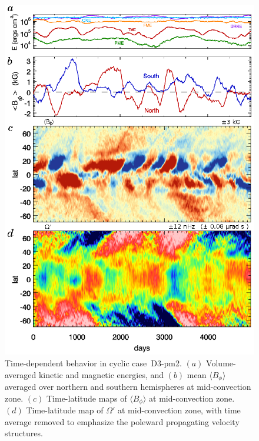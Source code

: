 \begin{figure}
  \begin{center}
    \includegraphics[width=0.8\linewidth]{figs/chapter_8/time_history_mmc_vturf_3_pm2.eps}
  \end{center}
    \caption[Time-dependent behavior in cyclic case~D3-pm2]
	  {Time-dependent behavior in cyclic case~D3-pm2.  $(a)$
	  Volume-averaged kinetic and magnetic energies, and 
	  $(b)$ mean $\langle B_\phi \rangle$ averaged over northern
	  and southern hemispheres at mid-convection zone.
	  $(c)$  Time-latitude maps of $\langle B_\phi \rangle$ at
	  mid-convection zone.  
	  $(d)$   Time-latitude map of $\Omega'$ at mid-convection zone,
	  with time average removed to emphasize the poleward
	  propagating velocity structures. 
	  \label{fig:D3 pm2}}
\end{figure}

